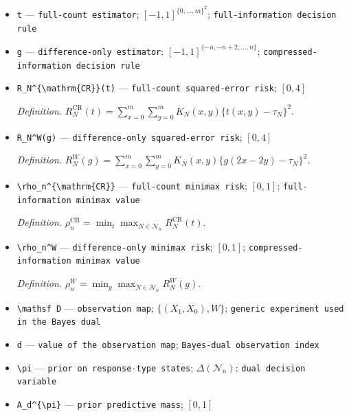 \documentclass{article}
\begin{document}
\begin{itemize}
  \item \texttt{t} --- \texttt{full-\allowbreak{}count estimator}; \([-1,1]^{\{0,\ldots,m\}^2}\); \texttt{full-\allowbreak{}information decision rule}
  \item \texttt{g} --- \texttt{difference-\allowbreak{}only estimator}; \([-1,1]^{\{-n,-n+2,\ldots,n\}}\); \texttt{compressed-\allowbreak{}information decision rule}
  \item \texttt{R\_\allowbreak{}N\textasciicircum{}\{\textbackslash{}\allowbreak{}mathrm\{CR\}\allowbreak{}\}\allowbreak{}(t)} --- \texttt{full-\allowbreak{}count squared-\allowbreak{}error risk}; \([0,4]\)
  \par\smallskip\noindent\emph{Definition.} \(R_N^{\mathrm{CR}}(t)=\sum_{x=0}^m\sum_{y=0}^mK_N(x,y)\{t(x,y)-\tau_N\}^2\).
  \item \texttt{R\_\allowbreak{}N\textasciicircum{}W(g)} --- \texttt{difference-\allowbreak{}only squared-\allowbreak{}error risk}; \([0,4]\)
  \par\smallskip\noindent\emph{Definition.} \(R_N^W(g)=\sum_{x=0}^m\sum_{y=0}^mK_N(x,y)\{g(2x-2y)-\tau_N\}^2\).
  \item \texttt{\textbackslash{}\allowbreak{}rho\_\allowbreak{}n\textasciicircum{}\{\textbackslash{}\allowbreak{}mathrm\{CR\}\allowbreak{}\}\allowbreak{}} --- \texttt{full-\allowbreak{}count minimax risk}; \([0,1]\); \texttt{full-\allowbreak{}information minimax value}
  \par\smallskip\noindent\emph{Definition.} \(\rho_n^{\mathrm{CR}}=\min_t\max_{N\in\mathcal N_n}R_N^{\mathrm{CR}}(t)\).
  \item \texttt{\textbackslash{}\allowbreak{}rho\_\allowbreak{}n\textasciicircum{}W} --- \texttt{difference-\allowbreak{}only minimax risk}; \([0,1]\); \texttt{compressed-\allowbreak{}information minimax value}
  \par\smallskip\noindent\emph{Definition.} \(\rho_n^W=\min_g\max_{N\in\mathcal N_n}R_N^W(g)\).
  \item \texttt{\textbackslash{}\allowbreak{}mathsf D} --- \texttt{observation map}; \(\{(X_1,X_0),W\}\); \texttt{generic experiment used in the Bayes dual}
  \item \texttt{d} --- \texttt{value of the observation map}; \texttt{Bayes-\allowbreak{}dual observation index}
  \item \texttt{\textbackslash{}\allowbreak{}pi} --- \texttt{prior on response-\allowbreak{}type states}; \(\Delta(\mathcal N_n)\); \texttt{dual decision variable}
  \item \texttt{A\_\allowbreak{}d\textasciicircum{}\{\textbackslash{}\allowbreak{}pi\}\allowbreak{}} --- \texttt{prior predictive mass}; \([0,1]\)

\end{itemize}
\end{document}
